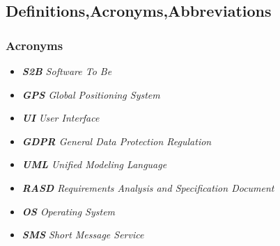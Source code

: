\subsection{Definitions,Acronyms,Abbreviations}

\subsubsection{Acronyms}
\begin{itemize}
\item[] \emph{\textbf{S2B} Software To Be}
\item[] \emph{\textbf{GPS} Global Positioning System}
\item[] \emph{\textbf{UI} User Interface}
\item[] \emph{\textbf{GDPR} General Data Protection Regulation}
\item[] \emph{\textbf{UML} Unified Modeling Language}
\item[] \emph{\textbf{RASD} Requirements Analysis and Specification Document}
\item[] \emph{\textbf{OS} Operating System}
\item[] \emph{\textbf{SMS} Short Message Service}
\end{itemize}
